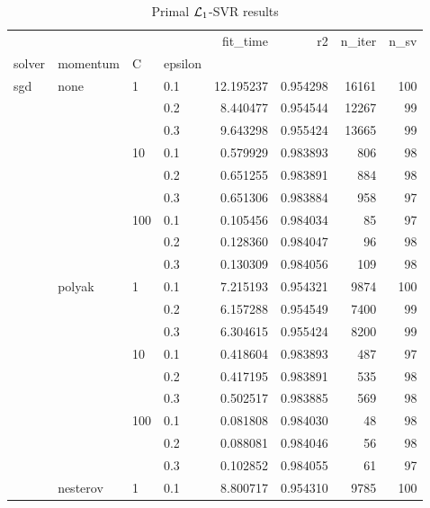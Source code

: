 \begin{table}[H]
\centering
\caption{Primal $\protect \mathcal{L}_1$-SVR results}
\label{primal_l1_svr_cv_results}
\begin{tabular}{llllrrrr}
\toprule
          &   &     &     &   fit\_time &        r2 &  n\_iter &  n\_sv \\
solver & momentum & C & epsilon &            &           &         &       \\
\midrule
sgd & none & 1   & 0.1 &  12.195237 &  0.954298 &   16161 &   100 \\
          &   &     & 0.2 &   8.440477 &  0.954544 &   12267 &    99 \\
          &   &     & 0.3 &   9.643298 &  0.955424 &   13665 &    99 \\
          &   & 10  & 0.1 &   0.579929 &  0.983893 &     806 &    98 \\
          &   &     & 0.2 &   0.651255 &  0.983891 &     884 &    98 \\
          &   &     & 0.3 &   0.651306 &  0.983884 &     958 &    97 \\
          &   & 100 & 0.1 &   0.105456 &  0.984034 &      85 &    97 \\
          &   &     & 0.2 &   0.128360 &  0.984047 &      96 &    98 \\
          &   &     & 0.3 &   0.130309 &  0.984056 &     109 &    98 \\
          & polyak & 1   & 0.1 &   7.215193 &  0.954321 &    9874 &   100 \\
          &   &     & 0.2 &   6.157288 &  0.954549 &    7400 &    99 \\
          &   &     & 0.3 &   6.304615 &  0.955424 &    8200 &    99 \\
          &   & 10  & 0.1 &   0.418604 &  0.983893 &     487 &    97 \\
          &   &     & 0.2 &   0.417195 &  0.983891 &     535 &    98 \\
          &   &     & 0.3 &   0.502517 &  0.983885 &     569 &    98 \\
          &   & 100 & 0.1 &   0.081808 &  0.984030 &      48 &    98 \\
          &   &     & 0.2 &   0.088081 &  0.984046 &      56 &    98 \\
          &   &     & 0.3 &   0.102852 &  0.984055 &      61 &    97 \\
          & nesterov & 1   & 0.1 &   8.800717 &  0.954310 &    9785 &   100 \\

\end{tabular}
\end{table}
